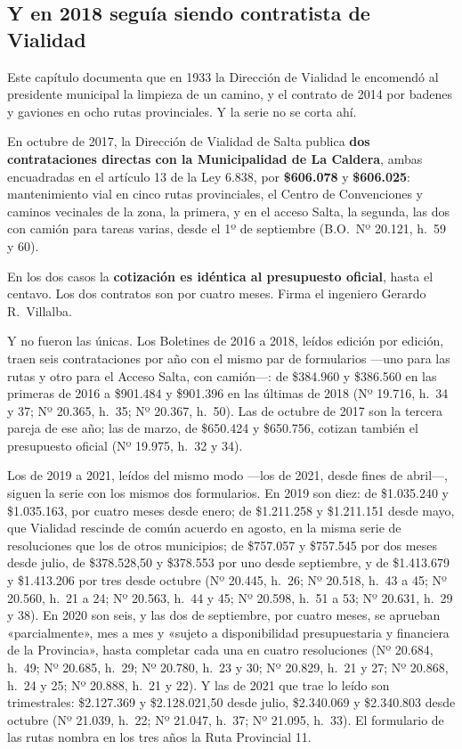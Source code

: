 \subsection*{Y en 2018 seguía siendo contratista de Vialidad}

Este capítulo documenta que en 1933 la Dirección de Vialidad le encomendó al
presidente municipal la limpieza de un camino, y el contrato de 2014
por badenes y gaviones en ocho rutas provinciales. Y la serie no se corta ahí.

En octubre de 2017, la Dirección de Vialidad de Salta publica \textbf{dos contrataciones
directas con la Municipalidad de La Caldera}, ambas encuadradas en el artículo 13 de la Ley
6.838, por \textbf{\$606.078} y \textbf{\$606.025}: mantenimiento vial en cinco rutas
provinciales, el Centro de Convenciones y caminos vecinales de la zona, la primera, y en el
acceso Salta, la segunda, las dos con camión para tareas varias, desde el 1º de septiembre (B.O.\ Nº 20.121, h.\ 59 y 60).

En los dos casos la \textbf{cotización es idéntica al presupuesto oficial}, hasta el centavo.
Los dos contratos son por cuatro meses. Firma el ingeniero Gerardo R.\ Villalba.

Y no fueron las únicas. Los Boletines de 2016 a 2018, leídos edición por edición, traen seis contrataciones por año con el mismo par de formularios ---uno para las rutas y otro para el Acceso Salta, con camión---: de \$384.960 y \$386.560 en las primeras de 2016 a \$901.484 y \$901.396 en las últimas de 2018 (Nº 19.716, h.\ 34 y 37; Nº 20.365, h.\ 35; Nº 20.367, h.\ 50). Las de octubre de 2017 son la tercera pareja de ese año; las de marzo, de \$650.424 y \$650.756, cotizan también el presupuesto oficial (Nº 19.975, h.\ 32 y 34).

Los de 2019 a 2021, leídos del mismo modo ---los de 2021, desde fines de abril---, siguen la serie con los mismos dos formularios. En 2019 son diez: de \$1.035.240 y \$1.035.163, por cuatro meses desde enero; de \$1.211.258 y \$1.211.151 desde mayo, que Vialidad rescinde de común acuerdo en agosto, en la misma serie de resoluciones que los de otros municipios; de \$757.057 y \$757.545 por dos meses desde julio, de \$378.528,50 y \$378.553 por uno desde septiembre, y de \$1.413.679 y \$1.413.206 por tres desde octubre (Nº 20.445, h.\ 26; Nº 20.518, h.\ 43 a 45; Nº 20.560, h.\ 21 a 24; Nº 20.563, h.\ 44 y 45; Nº 20.598, h.\ 51 a 53; Nº 20.631, h.\ 29 y 38). En 2020 son seis, y las dos de septiembre, por cuatro meses, se aprueban «parcialmente», mes a mes y «sujeto a disponibilidad presupuestaria y financiera de la Provincia», hasta completar cada una en cuatro resoluciones (Nº 20.684, h.\ 49; Nº 20.685, h.\ 29; Nº 20.780, h.\ 23 y 30; Nº 20.829, h.\ 21 y 27; Nº 20.868, h.\ 24 y 25; Nº 20.888, h.\ 21 y 22). Y las de 2021 que trae lo leído son trimestrales: \$2.127.369 y \$2.128.021,50 desde julio, \$2.340.069 y \$2.340.803 desde octubre (Nº 21.039, h.\ 22; Nº 21.047, h.\ 37; Nº 21.095, h.\ 33). El formulario de las rutas nombra en los tres años la Ruta Provincial 11.

